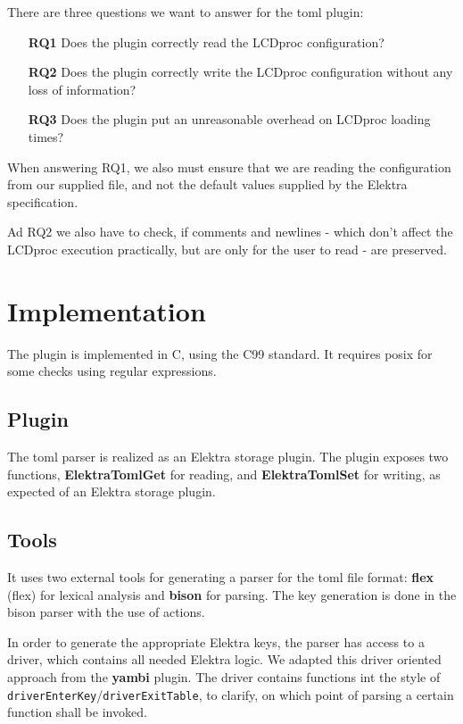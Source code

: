 \documentclass[draft,final]{vutinfth} %
\begin{document}
There are three questions we want to answer for the \acrshort{toml} plugin:
\begin{itemize}
	\item[\textbf{RQ1}] Does the plugin correctly read the LCDproc configuration?
	\item[\textbf{RQ2}] Does the plugin correctly write the LCDproc configuration without any loss of information?
	\item[\textbf{RQ3}] Does the plugin put an unreasonable overhead on LCDproc loading times?
\end{itemize}
When answering RQ1, we also must ensure that we are reading the configuration from our supplied file, and not the default values supplied by the Elektra specification.

Ad RQ2 we also have to check, if comments and newlines - which don't affect the LCDproc execution practically, but are only for the user to read - are preserved.

\chapter{Implementation}

The plugin is implemented in C, using the C99 standard. It requires \acrshort{posix} for some checks using regular expressions.

\section{Plugin}
The \acrshort{toml} parser is realized as an Elektra storage plugin. The plugin exposes two functions, \textbf{ElektraTomlGet} for reading, and \textbf{ElektraTomlSet} for writing, as expected of an Elektra storage plugin.

\section{Tools}
It uses two external tools for generating a parser for the toml file format: \textbf{\acrshort{flex}} (\acrlong{flex}) \cite{flexgit} for lexical analysis and \textbf{bison} \cite{bisonmain} for parsing.
The key generation is done in the bison parser with the use of actions.

In order to generate the appropriate Elektra keys, the parser has access to a driver, which contains all needed Elektra logic.
We adapted this driver oriented approach from the \textbf{yambi}\cite{Elektrayambi} plugin.
The driver contains functions int the style of \\ \texttt{driverEnterKey}/\texttt{driverExitTable}, to clarify, on which point of parsing a certain function shall be invoked.
\end{document}
